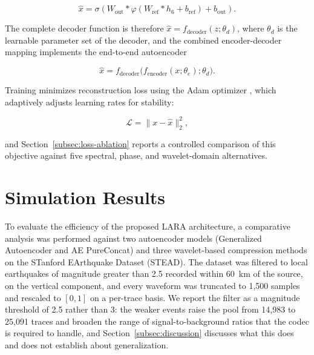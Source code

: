 \documentclass[fleqn,10pt]{wlscirep}
\begin{document}
\begin{equation}
\hat{x} = \sigma\!\left(W_{\text{out}} \ast \varphi\!\left(W_{\text{ref}} \ast h_{6} + b_{\text{ref}}\right) + b_{\text{out}}\right).
\end{equation}

The complete decoder function is therefore $\hat{x} = f_{\text{decoder}}(z; \theta_{d})$, where $\theta_{d}$ is the learnable parameter set of the decoder, and the combined encoder-decoder mapping implements the end-to-end autoencoder

\begin{equation}
\hat{x} = f_{\text{decoder}}\big(f_{\text{encoder}}(x; \theta_{e}); \theta_{d}\big).
\end{equation}

Training minimizes reconstruction loss using the Adam optimizer \cite{kingma2015adam}, which adaptively adjusts learning rates for stability:

\begin{equation}
\mathcal{L} = \| x - \hat{x} \|_2^2,
\end{equation}

and Section~\ref{subsec:loss-ablation} reports a controlled comparison of this objective against five spectral, phase, and wavelet-domain alternatives.

\section{Simulation Results}
\label{sec:results}

To evaluate the efficiency of the proposed LARA architecture, a comparative analysis was performed against two autoencoder models (Generalized Autoencoder and AE PureConcat) and three wavelet-based compression methods on the STanford EArthquake Dataset (STEAD). The dataset was filtered to local earthquakes of magnitude greater than 2.5 recorded within 60~km of the source, on the vertical component, and every waveform was truncated to 1,500 samples and rescaled to $[0,1]$ on a per-trace basis. We report the filter as a magnitude threshold of 2.5 rather than 3: the weaker events raise the pool from 14,983 to 25,091 traces and broaden the range of signal-to-background ratios that the codec is required to handle, and Section~\ref{subsec:discussion} discusses what this does and does not establish about generalization.
\end{document}
